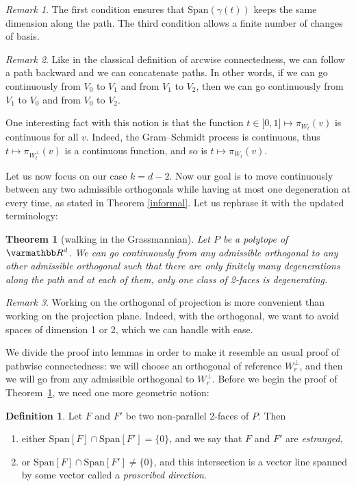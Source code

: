 \documentclass[12pt, notitlepage]{article}
\renewcommand{\mathbb}{\varmathbb}
\theoremstyle{plain}
\newtheorem{thm}{Theorem}[section]
\theoremstyle{definition}
\newtheorem{defin}{Definition}
\theoremstyle{plain}
\theoremstyle{remark}
\newtheorem*{rmk}{Remark}
\theoremstyle{plain}
\theoremstyle{plain}
\newcommand{\R}{\mathbb R}
\newcommand{\vect}{\text{Span}}
\begin{document}
\begin{rmk}
    The first condition ensures that $\vect(\gamma(t))$ keeps the same dimension along the path. The third condition allows a finite number of changes of basis.
\end{rmk}

\begin{rmk}
    Like in the classical definition of arcwise connectedness, we can follow a path backward and we can concatenate paths. In other words, if we can go continuously from $V_0$ to $V_1$ and from $V_1$ to $V_2$, then we can go continuously from $V_1$ to $V_0$ and from $V_0$ to $V_2$.
\end{rmk}

One interesting fact with this notion is that the function $t \in \mathopen[0,1\mathclose] \mapsto \pi_{W_t}(v)$ is continuous for all $v$. Indeed, the Gram--Schmidt process is continuous, thus $t \mapsto \pi_{W_t^\perp}(v)$ is a continuous function, and so is $t \mapsto \pi_{W_t}(v)$.

Let us now focus on our case $k = d-2$. Now our goal is to move continuously between any two admissible orthogonals while having at most one degeneration at every time, as stated in Theorem \ref{informal}. Let us rephrase it with the updated terminology: 

\begin{thm}[walking in the Grassmannian]
\label{balade}
    Let $P$ be a polytope of $\R^d$. We can go continuously from any admissible orthogonal to any other admissible orthogonal such that there are only finitely many degenerations along the path and at each of them, only one class of 2-faces is degenerating.
\end{thm}

\begin{rmk}
    Working on the orthogonal of projection is more convenient than working on the projection plane. Indeed, with the orthogonal, we want to avoid spaces of dimension 1 or 2, which we can handle with ease.
\end{rmk}

We divide the proof into lemmas in order to make it resemble an usual proof of pathwise connectedness: we will choose an orthogonal of reference $W_r^\perp$, and then we will go from any admissible orthogonal to $W_r^\perp$. Before we begin the proof of Theorem~\ref{balade}, we need one more geometric notion:

\begin{defin}
    Let $F$ and $F'$ be two non-parallel 2-faces of $P$. Then
    \begin{enumerate}
        \item either $\vect[F]\cap \vect[F'] = \{0\}$, and we say that $F$ and $F'$ are \emph{estranged},
        \item or $\vect[F]\cap \vect[F'] \neq \{0\}$, and this intersection is a vector line spanned by some vector called a \emph{proscribed direction}.
    \end{enumerate}
\end{defin}
\end{document}
